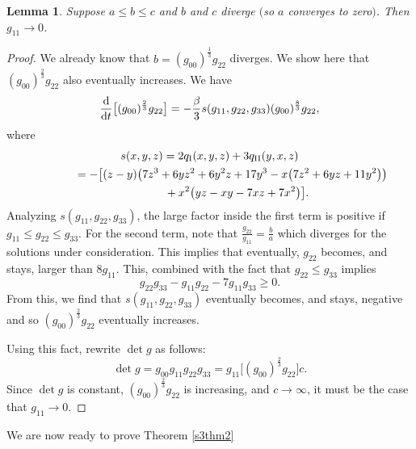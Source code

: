 \documentclass[pdftex]{sigma}
\numberwithin{equation}{section}
\newtheorem{Lemma}[Theorem]{Lemma}
\newcommand{\dtime}{\frac{{\rm d}}{{\rm d} t}} %
\begin{document}
\begin{Lemma} \label{s3azerobcinfinitylemma2}
Suppose $a \leq b \leq c$ and $b$ and $c$ diverge $($so $a$ converges to zero$)$. Then $g_{11} \rightarrow 0$.
\end{Lemma}

\begin{proof}We already know that $b = (g_{00})^{\frac{1}{3}} g_{22}$ diverges. We show here that $(g_{00})^{\frac{2}{3}} g_{22}$ also eventually increases. We have
\[
\dtime \big[(g_{00})^{\frac{2}{3}} g_{22}\big]
	= -\frac{\beta}{3} s(g_{11}, g_{22}, g_{33}) (g_{00})^{\frac{8}{3}} g_{22},
\]
where
\begin{gather*}
s(x, y, z) = 2 q_{\rm I}(x, y, z) + 3 q_{\rm II}(y, x, z) \\
\hphantom{s(x, y, z)}{} = -\big[(z-y)\big(7z^3 + 6yz^2 + 6y^2z + 17y^3 - x\big(7z^2 + 6yz + 11y^2\big)\big) \\
\hphantom{s(x, y, z) =}{} + x^2\big(yz -xy - 7xz + 7x^2\big)\big].
\end{gather*}
Analyzing $s(g_{11}, g_{22}, g_{33})$, the large factor inside the first term is positive if $g_{11} \leq g_{22} \leq g_{33}$. For the second term, note that $\frac{g_{22}}{g_{11}} = \frac{b}{a}$ which diverges for the solutions under consideration. This implies that eventually, $g_{22}$ becomes, and stays, larger than $8 g_{11}$. This, combined with the fact that $g_{22} \leq g_{33}$ implies
\[
g_{22} g_{33} -g_{11} g_{22} - 7g_{11} g_{33} \geq 0.
\]
From this, we find that $s(g_{11}, g_{22}, g_{33})$ eventually becomes, and stays, negative and so $(g_{00})^{\frac{2}{3}} g_{22}$ eventually increases.

Using this fact, rewrite $\det g$ as follows:
\begin{equation*}
\det g = g_{00} g_{11} g_{22} g_{33}
	= g_{11} \big[(g_{00})^{\frac{2}{3}} g_{22}\big] c.
\end{equation*}
Since $\det g$ is constant, $(g_{00})^{\frac{2}{3}} g_{22}$ is increasing, and $c \rightarrow \infty$, it must be the case that $g_{11} \rightarrow 0$.
\end{proof}

We are now ready to prove Theorem \ref{s3thm2}
\end{document}

